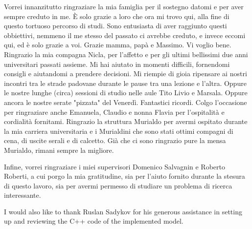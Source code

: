 \vspace{1.0cm}
{
	\setlength\parindent{0pt}

	Vorrei innanzitutto ringraziare la mia famiglia per il sostegno datomi e per aver sempre creduto in me.
	È solo grazie a loro che ora mi trovo qui, alla fine di questo tortuoso percorso di studi.
	Sono entusiasta di aver raggiunto questi obbiettivi, nemmeno il me stesso del passato ci avrebbe creduto,
	e invece eccomi qui, ed è solo grazie a voi.
	Grazie mamma, papà e Massimo.
	Vi voglio bene.
	Ringrazio la mia compagna Nicla, per l'affetto e per gli ultimi bellissimi due anni universitari passati assieme.
	Mi hai aiutato in momenti difficili, fornendomi consigli e aiutandomi a prendere decisioni.
	Mi riempie di gioia ripensare ai nostri incontri tra le strade padovane durante le pause tra una lezione e l'altra.
	Oppure le nostre lunghe (circa) sessioni di studio nelle aule Tito Livio e Marsala.
	Oppure ancora le nostre serate "pizzata" del Venerdì.
	Fantastici ricordi.
	Colgo l'occasione per ringraziare anche Emanuela, Claudio e nonna Flavia per l'ospitalità
	e cordialità fornitami.
	Ringrazio la struttura Murialdo per avermi ospitato durante la mia carriera universitaria e
	i Murialdini che sono stati ottimi compagni di cena, di uscite serali e di calcetto.
	Già che ci sono ringrazio pure la mensa Murialdo, rimani sempre la migliore.

	\medskip

	Infine, vorrei ringraziare i miei supervisori Domenico Salvagnin e Roberto Roberti,
	a cui porgo la mia gratitudine, sia per l'aiuto fornito durante la stesura di questo lavoro,
	sia per avermi permesso di studiare un problema di ricerca interessante.

	I would also like to thank Ruslan Sadykov for his generous assistance in setting up \bapcod{} and reviewing the C++ code of the implemented model.

}


\vspace{1cm}

{
	\setlength\parindent{0pt}

	\textit{\UnivPlace}\\
	\textit{\GraduationDate}    \hfill    \AuthorName{} \AuthorSurname{}
}
